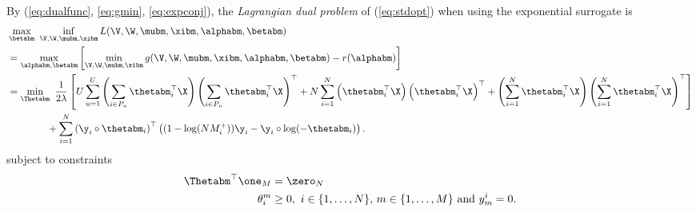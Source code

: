 By (\ref{eq:dualfunc}, \ref{eq:gmin}, \ref{eq:expconj}), the \emph{Lagrangian dual problem} of (\ref{eq:stdopt}) when using the exponential surrogate is
\begin{equation*}
\begin{aligned}
&\max_{\betabm} \ \inf_{\V, \W, \mubm, \xibm} L(\V, \W, \mubm, \xibm, \alphabm, \betabm) \\
&= \max_{\alphabm, \betabm} \left[ \min_{\V, \W, \mubm, \xibm} g(\V, \W, \mubm, \xibm, \alphabm, \betabm) - r(\alphabm) \right] \\
&= \min_{\Thetabm} \ \frac{1}{2 \lambda} \left[
     U \sum_{u=1}^U \left( \sum_{i \in P_u} \thetabm_i^\top \X \right) \left( \sum_{i \in P_u} \thetabm_i^\top \X \right)^\top
   + N \sum_{i=1}^N \left( \thetabm_i^\top \X \right) \left( \thetabm_i^\top \X \right)^\top
   + \left( \sum_{i=1}^N \thetabm_i^\top \X \right) \left( \sum_{i=1}^N \thetabm_i^\top \X \right)^\top \right] \\
& \hspace{4em}
   + \sum_{i=1}^N \left( \y_i \circ \thetabm_i \right)^\top 
     \left( (1 - \log(N M_i^+)) \y_i - \y_i \circ \log(-\thetabm_i) \right).
\end{aligned}
\end{equation*}
subject to constraints
\begin{equation*}
\begin{aligned}
\Thetabm^\top \one_M &= \zero_N \\
\theta_i^m & \ge 0, \ i \in \{1,\dots,N\}, \, m \in \{1,\dots,M\} \ \mathrm{and} \ y_m^i = 0.
\end{aligned}
\end{equation*}

